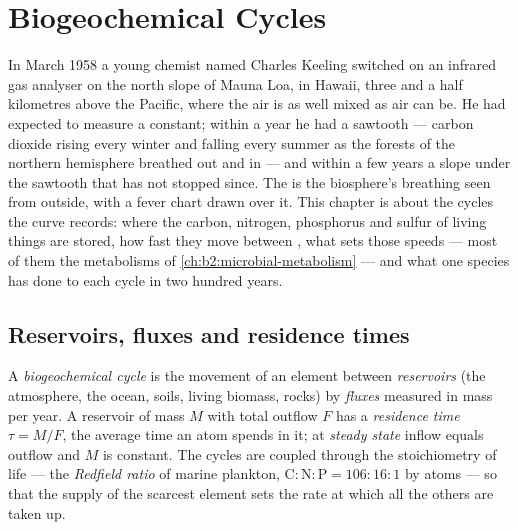 \chapter{Biogeochemical Cycles}\label{ch:b2:biogeochemical-cycles}

In March 1958 a young chemist named Charles Keeling switched on an
infrared gas analyser on the north slope of Mauna Loa, in Hawaii,
three and a half kilometres above the Pacific, where the air is
as well mixed as air can be. He had expected to measure a constant;
within a year he had a sawtooth --- carbon dioxide rising every
winter and falling every summer as the forests of the northern
hemisphere breathed out and in --- and within a few years a slope
under the sawtooth that has not stopped since. The 
is the biosphere's breathing seen from outside, with a fever chart
drawn over it. This chapter is about the cycles the curve records:
where the carbon, nitrogen, phosphorus and sulfur of living things
are stored, how fast they move between , what sets those
speeds --- most of them the metabolisms of
\cref{ch:b2:microbial-metabolism} --- and what one species has done
to each cycle in two hundred years.

\section{Reservoirs, fluxes and residence times}

\begin{definition}\label{def:b2:biogeochemical-cycles:reservoir}
A \emph{biogeochemical cycle} is the movement of an element between
\emph{reservoirs} (the atmosphere, the ocean, soils, living
biomass, rocks) by \emph{fluxes} measured in mass per year. A
reservoir of mass $M$ with total outflow $F$ has a \emph{residence
time} $\tau = M/F$, the average time an atom spends in it; at
\emph{steady state} inflow equals outflow and $M$ is constant. The
cycles are coupled through the stoichiometry of life --- the
\emph{Redfield ratio} of marine plankton, $\mathrm{C:N:P} =
106:16:1$ by atoms --- so that the supply of the scarcest element
sets the rate at which all the others are taken up.
\end{definition}

